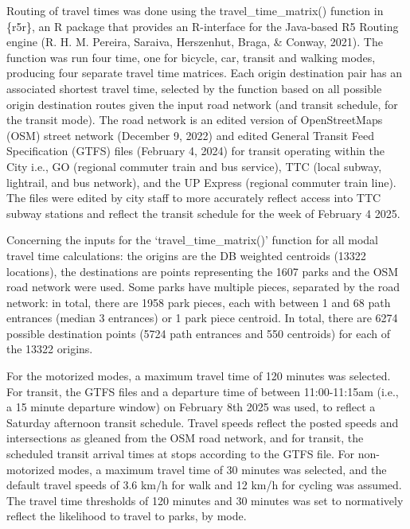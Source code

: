 \documentclass[
11pt, %
oneside, %
english, %
singlespacing, %
]{macthesis} %
\begin{document}
Routing of travel times was done using the travel\_time\_matrix() function in \{r5r\}, an R package that provides an R-interface for the Java-based R5 Routing engine (R. H. M. Pereira, Saraiva, Herszenhut, Braga, \& Conway, 2021). The function was run four time, one for bicycle, car, transit and walking modes, producing four separate travel time matrices. Each origin destination pair has an associated shortest travel time, selected by the function based on all possible origin destination routes given the input road network (and transit schedule, for the transit mode). The road network is an edited version of OpenStreetMaps (OSM) street network (December 9, 2022) and edited General Transit Feed Specification (GTFS) files (February 4, 2024) for transit operating within the City i.e., GO (regional commuter train and bus service), TTC (local subway, lightrail, and bus network), and the UP Express (regional commuter train line). The files were edited by city staff to more accurately reflect access into TTC subway stations and reflect the transit schedule for the week of February 4 2025.

Concerning the inputs for the `travel\_time\_matrix()' function for all modal travel time calculations: the origins are the DB weighted centroids (13322 locations), the destinations are points representing the 1607 parks and the OSM road network were used. Some parks have multiple pieces, separated by the road network: in total, there are 1958 park pieces, each with between 1 and 68 path entrances (median 3 entrances) or 1 park piece centroid. In total, there are 6274 possible destination points (5724 path entrances and 550 centroids) for each of the 13322 origins.

For the motorized modes, a maximum travel time of 120 minutes was selected. For transit, the GTFS files and a departure time of between 11:00-11:15am (i.e., a 15 minute departure window) on February 8th 2025 was used, to reflect a Saturday afternoon transit schedule. Travel speeds reflect the posted speeds and intersections as gleaned from the OSM road network, and for transit, the scheduled transit arrival times at stops according to the GTFS file. For non-motorized modes, a maximum travel time of 30 minutes was selected, and the default travel speeds of 3.6 km/h for walk and 12 km/h for cycling was assumed. The travel time thresholds of 120 minutes and 30 minutes was set to normatively reflect the likelihood to travel to parks, by mode.
\end{document}
